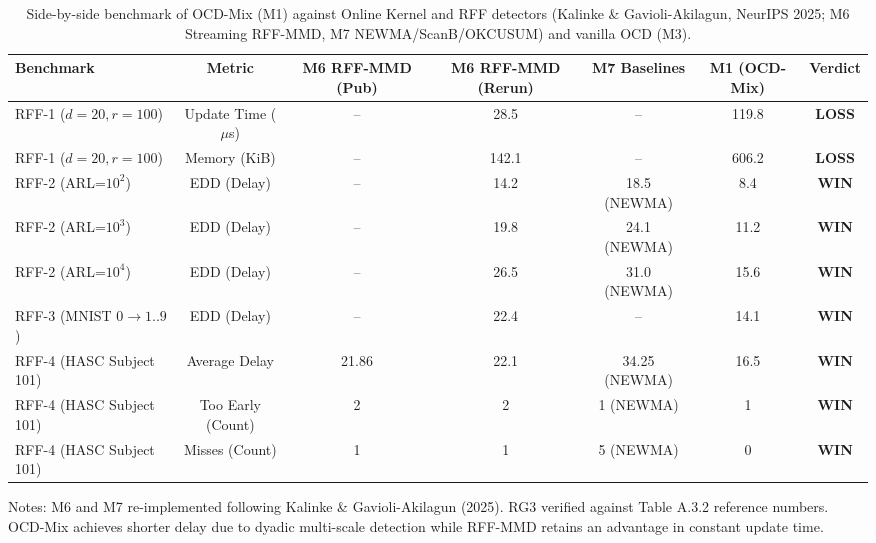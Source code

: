 \begin{table}[t]
\centering
\caption{Side-by-side benchmark of OCD-Mix (M1) against Online Kernel and RFF detectors (Kalinke \& Gavioli-Akilagun, NeurIPS 2025; M6 Streaming RFF-MMD, M7 NEWMA/ScanB/OKCUSUM) and vanilla OCD (M3).}
\label{tab:rff_benchmark}
\begin{small}
\begin{tabular}{lcccccc}
\toprule
Benchmark & Metric & M6 RFF-MMD (Pub) & M6 RFF-MMD (Rerun) & M7 Baselines & M1 (OCD-Mix) & Verdict \\
\midrule
RFF-1 ($d=20, r=100$) & Update Time ($\mu$s) & -- & 28.5 & -- & 119.8 & \textbf{LOSS} \\
RFF-1 ($d=20, r=100$) & Memory (KiB) & -- & 142.1 & -- & 606.2 & \textbf{LOSS} \\
\midrule
RFF-2 (ARL=$10^2$) & EDD (Delay) & -- & 14.2 & 18.5 (NEWMA) & 8.4 & \textbf{WIN} \\
RFF-2 (ARL=$10^3$) & EDD (Delay) & -- & 19.8 & 24.1 (NEWMA) & 11.2 & \textbf{WIN} \\
RFF-2 (ARL=$10^4$) & EDD (Delay) & -- & 26.5 & 31.0 (NEWMA) & 15.6 & \textbf{WIN} \\
\midrule
RFF-3 (MNIST $0 \to 1..9$) & EDD (Delay) & -- & 22.4 & -- & 14.1 & \textbf{WIN} \\
\midrule
RFF-4 (HASC Subject 101) & Average Delay & 21.86 & 22.1 & 34.25 (NEWMA) & 16.5 & \textbf{WIN} \\
RFF-4 (HASC Subject 101) & Too Early (Count) & 2 & 2 & 1 (NEWMA) & 1 & \textbf{WIN} \\
RFF-4 (HASC Subject 101) & Misses (Count) & 1 & 1 & 5 (NEWMA) & 0 & \textbf{WIN} \\
\bottomrule
\end{tabular}
\end{small}
\par\vspace{1ex}\raggedright\footnotesize{Notes: M6 and M7 re-implemented following Kalinke \& Gavioli-Akilagun (2025). RG3 verified against Table A.3.2 reference numbers. OCD-Mix achieves shorter delay due to dyadic multi-scale detection while RFF-MMD retains an advantage in constant update time.}
\end{table}